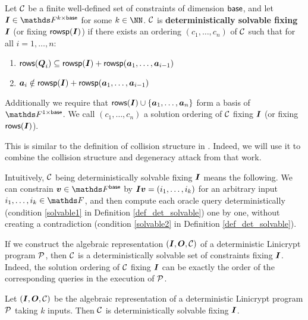\begin{defn}
\label{def_det_solvable}
    Let $\C$ be a finite well-defined set of constraints of dimension $\base$,
    and let $\I \in \F^{k \times \base}$ for some $k \in \NN$.
    $\C$ is \textbf{deterministically solvable fixing} $\I$ (or fixing $\rowsp(\I)$)
    if there exists an ordering $(c_1, \dots, c_n)$ of $\C$
    such that for all $i=1, \dots, n$:
    \begin{enumerate}
    \item
        \label{solvable1}
        $\rows(\Q_i) \subseteq \rowsp(\I) + \rowsp(\va_1, \dots, \va_{i-1})$
    \item
        \label{solvable2}
        $\va_i \notin \rowsp(\I) + \rowsp(\va_1, \dots, \va_{i-1})$
    \end{enumerate}
    Additionally we require that $\rows(\I) \cup \{\va_1, \dots, \va_n\}$ form a basis of $\F^{1\times\base}$.
    We call $(c_1, \dots, c_n)$ a solution ordering of $\C$ fixing $\I$ (or fixing $\rows(\I)$).
\end{defn}

This is similar to the definition of collision structure in \cite{TCC:McQSwoRos19}.
Indeed, we will use it to combine the collision structure and degeneracy attack from that work.

Intuitively, $\C$ being deterministically solvable fixing $\I$ means the following.
We can constrain $\vv \in \Fsp$ by $\Inp \vv = (i_1, \dots, i_k)$ for an arbitrary input $i_1, \dots, i_k \in \F$,
and then compute each oracle query deterministically (condition \ref{solvable1} in Definition \ref{def_det_solvable}) one by one,
without creating a contradiction (condition \ref{solvable2} in Definition \ref{def_det_solvable}).

If we construct the algebraic representation $(\I, \O, \C)$ of a deterministic Linicrypt program $\P$,
then $\C$ is a deterministically solvable set of constraints fixing $\I$.
Indeed, the solution ordering of $\C$ fixing $\I$
can be exactly the order of the corresponding queries in the execution of $\P$.

\begin{lemma}
\label{alg_rep_det_solvable}
    Let $(\I, \O, \C)$ be the algebraic representation of a deterministic Linicrypt program $\P$ taking $k$ inputs.
    Then $\C$ is deterministically solvable fixing $\I$.
\end{lemma}

